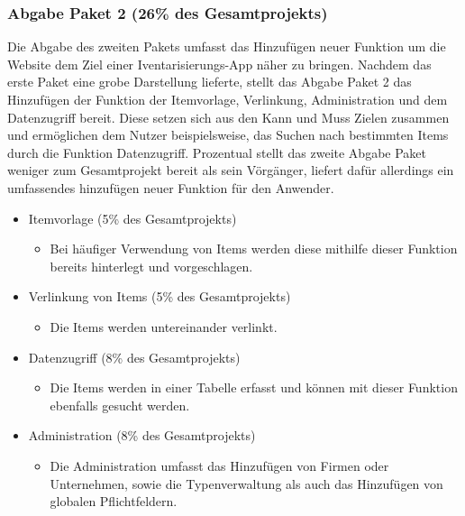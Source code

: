 \documentclass[11pt,a4paper]{report}
\begin{document}
\subsubsection{Abgabe Paket 2 (26\% des Gesamtprojekts)}
Die Abgabe des zweiten Pakets umfasst das Hinzufügen neuer Funktion um die Website dem Ziel einer Iventarisierungs-App näher zu bringen.
Nachdem das erste Paket eine grobe Darstellung lieferte, stellt das Abgabe Paket 2 das Hinzufügen der Funktion der Itemvorlage, Verlinkung, Administration und dem Datenzugriff bereit.
Diese setzen sich aus den Kann und Muss Zielen zusammen und ermöglichen dem Nutzer beispielsweise, das Suchen nach bestimmten Items durch die Funktion Datenzugriff.
Prozentual stellt das zweite Abgabe Paket weniger zum Gesamtprojekt bereit als sein Vörgänger, liefert dafür allerdings ein umfassendes hinzufügen neuer Funktion für den Anwender.
\begin{itemize}
\item
  Itemvorlage (5\% des Gesamtprojekts)

  \begin{itemize}
  \item
    Bei häufiger Verwendung von Items werden diese mithilfe dieser Funktion bereits hinterlegt
    und vorgeschlagen.
  \end{itemize}
  
\item
  Verlinkung von Items (5\% des Gesamtprojekts)

  \begin{itemize}
  \item
    Die Items werden untereinander verlinkt.
  \end{itemize}
  
\item
  Datenzugriff (8\% des Gesamtprojekts)

  \begin{itemize}
  \item
    Die Items werden in einer Tabelle erfasst und können mit dieser Funktion ebenfalls
    gesucht werden.
  \end{itemize}
  
\item
  Administration (8\% des Gesamtprojekts)

  \begin{itemize}
  \item
    Die Administration umfasst das Hinzufügen von Firmen oder
    Unternehmen, sowie die Typenverwaltung als auch das Hinzufügen von
    globalen Pflichtfeldern.
  \end{itemize}
  
\end{itemize}
\end{document}
